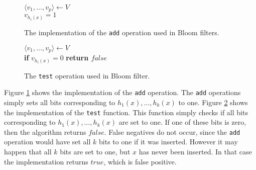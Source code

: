 \begin{figure}
	\centering
	\begin{algorithm}[H]
		\SetStartEndCondition{ }{}{}%
		\AlgoDontDisplayBlockMarkers\SetAlgoNoEnd\SetAlgoNoLine%
		
		 {
			$\langle v_1, \dots, v_p \rangle \gets V$ \\
			 {
				$v_{h_i(x)} = 1$
			}
		}
	\end{algorithm}

	\caption{The implementation of the \texttt{add} operation used in Bloom filters.}
	\label{fig:bloom_add}
\end{figure}

\begin{figure}
	\centering
	\begin{algorithm}[H]
		\SetStartEndCondition{ }{}{}%
		\AlgoDontDisplayBlockMarkers\SetAlgoNoEnd\SetAlgoNoLine%

		 {
			$\langle v_1, \dots, v_p \rangle \gets V$ \\
			 {
				\textbf{if} $v_{h_i(x)} = 0$ \textbf{return $false$}
			}
		}
	\end{algorithm}

	\caption{The \texttt{test} operation used in Bloom filter.}
	\label{fig:bloom_test}
\end{figure}

Figure \ref{fig:bloom_add} shows the implementation of the \texttt{add} operation. The \texttt{add} operations simply sets all bits corresponding to $h_1(x), \dots, h_k(x)$ to one. Figure \ref{fig:bloom_test} shows the implementation of the \texttt{test} function. This function simply checks if 
all bits corresponding to $h_1(x), \dots, h_k(x)$ are set to one. If one of these bits is zero, then the algorithm returns $false$. False negatives do not occur, since the \texttt{add} operation would have set all $k$ bits to one if it was inserted. However it may happen that all $k$ bits are set to one, but $x$ has never been inserted. In that case the implementation returns $true$, which is false positive.

